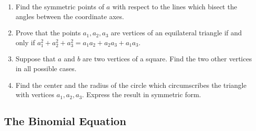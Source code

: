 \begin{enumerate}
\item
  Find the symmetric points of \(a\) with respect to the lines which bisect the
  angles between the coordinate axes.
\item
  Prove that the points \(a_1,a_2,a_3\) are vertices of an equilateral triangle
  if and only if \(a_1^2 + a_2^2 + a_3^2 = a_1a_2 + a_2a_3 + a_1a_3\).
\item
  Suppose that \(a\) and \(b\) are two vertices of a square.
  Find the two other vertices in all possible cases.
\item
  Find the center and the radius of the circle which circumscribes the triangle
  with vertices \(a_1,a_2,a_3\).
  Express the result in symmetric form.
\end{enumerate}

\subsection{The Binomial Equation}

